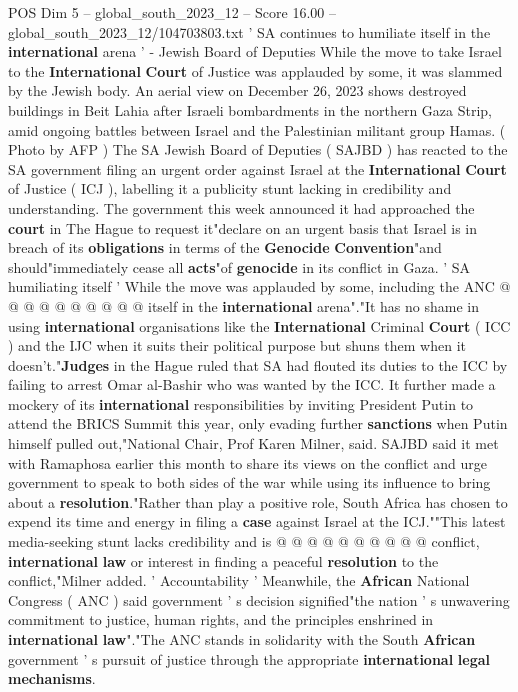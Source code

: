 \begin{textsample}{POS Dim 5 – global\_south\_2023\_12 – Score 16.00 – global\_south\_2023\_12/104703803.txt}  \label{ex:f5_pos_106}
' SA continues to humiliate itself in the \textbf{international} arena ' - Jewish Board of Deputies While the move to take Israel to the \textbf{International} \textbf{Court} of Justice was applauded by some, it was slammed by the Jewish body.
An aerial view on December 26, 2023 shows destroyed buildings in Beit Lahia after Israeli bombardments in the northern Gaza Strip, amid ongoing battles between Israel and the Palestinian militant group Hamas. ( Photo by AFP ) The SA Jewish Board of Deputies ( SAJBD ) has reacted to the SA government filing an urgent order against Israel at the \textbf{International} \textbf{Court} of Justice ( ICJ ), labelling it a publicity stunt lacking in credibility and understanding.
The government this week announced it had approached the \textbf{court} in The Hague to request it"declare on an urgent basis that Israel is in breach of its \textbf{obligations} in terms of the \textbf{Genocide} \textbf{Convention}"and should"immediately cease all \textbf{acts}"of \textbf{genocide} in its conflict in Gaza. ' SA humiliating itself ' While the move was applauded by some, including the ANC @ @ @ @ @ @ @ @ @ @ itself in the \textbf{international} arena"."It has no shame in using \textbf{international} organisations like the \textbf{International} Criminal \textbf{Court} ( ICC ) and the IJC when it suits their political purpose but shuns them when it doesn't."\textbf{Judges} in the Hague ruled that SA had flouted its duties to the ICC by failing to arrest Omar al-Bashir who was wanted by the ICC.
It further made a mockery of its \textbf{international} responsibilities by inviting President Putin to attend the BRICS Summit this year, only evading further \textbf{sanctions} when Putin himself pulled out,"National Chair, Prof Karen Milner, said.
SAJBD said it met with Ramaphosa earlier this month to share its views on the conflict and urge government to speak to both sides of the war while using its influence to bring about a \textbf{resolution}."Rather than play a positive role, South Africa has chosen to expend its time and energy in filing a \textbf{case} against Israel at the ICJ.""This latest media-seeking stunt lacks credibility and is @ @ @ @ @ @ @ @ @ @ conflict, \textbf{international} \textbf{law} or interest in finding a peaceful \textbf{resolution} to the conflict,"Milner added. ' Accountability ' Meanwhile, the \textbf{African} National Congress ( ANC ) said government ' s decision signified"the nation ' s unwavering commitment to justice, human rights, and the principles enshrined in \textbf{international} \textbf{law}"."The ANC stands in solidarity with the South \textbf{African} government ' s pursuit of justice through the appropriate \textbf{international} \textbf{legal} \textbf{mechanisms}.

\end{textsample}
